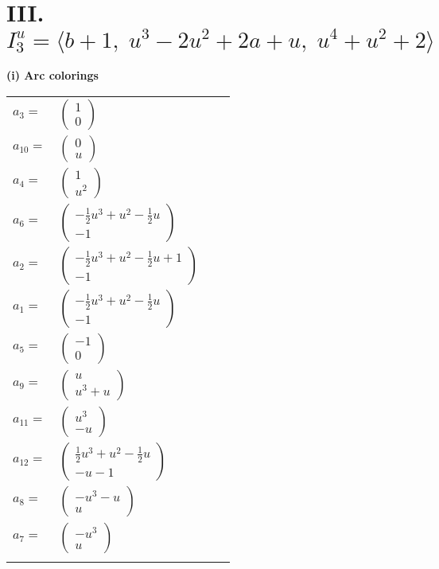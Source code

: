 \documentclass[1p]{elsarticle_modified}
\theoremstyle{definition}
\begin{document}
\centering \section*{III. $I^u_{3}= \langle b+1,\;u^3-2 u^2+2 a+u,\;u^4+u^2+2 \rangle$}
\flushleft \textbf{(i) Arc colorings}\\
\begin{tabular}{m{7pt} m{180pt} m{7pt} m{180pt} }
\flushright $a_{3}=$&$\begin{pmatrix}1\\0\end{pmatrix}$ \\
\flushright $a_{10}=$&$\begin{pmatrix}0\\u\end{pmatrix}$ \\
\flushright $a_{4}=$&$\begin{pmatrix}1\\u^2\end{pmatrix}$ \\
\flushright $a_{6}=$&$\begin{pmatrix}-\frac{1}{2} u^3+u^2-\frac{1}{2} u\\-1\end{pmatrix}$ \\
\flushright $a_{2}=$&$\begin{pmatrix}-\frac{1}{2} u^3+u^2-\frac{1}{2} u+1\\-1\end{pmatrix}$ \\
\flushright $a_{1}=$&$\begin{pmatrix}-\frac{1}{2} u^3+u^2-\frac{1}{2} u\\-1\end{pmatrix}$ \\
\flushright $a_{5}=$&$\begin{pmatrix}-1\\0\end{pmatrix}$ \\
\flushright $a_{9}=$&$\begin{pmatrix}u\\u^3+u\end{pmatrix}$ \\
\flushright $a_{11}=$&$\begin{pmatrix}u^3\\- u\end{pmatrix}$ \\
\flushright $a_{12}=$&$\begin{pmatrix}\frac{1}{2} u^3+u^2-\frac{1}{2} u\\- u-1\end{pmatrix}$ \\
\flushright $a_{8}=$&$\begin{pmatrix}- u^3- u\\u\end{pmatrix}$ \\
\flushright $a_{7}=$&$\begin{pmatrix}- u^3\\u\end{pmatrix}$\\&\end{tabular}
\end{document}
